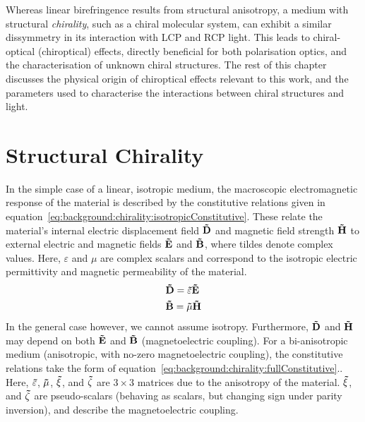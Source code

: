Whereas linear birefringence results from structural anisotropy, a medium with structural \textit{chirality}, such as a chiral molecular system, can exhibit a similar dissymmetry in its interaction with LCP and RCP light. This leads to chiral-optical (chiroptical) effects, directly beneficial for both polarisation optics, and the characterisation of unknown chiral structures. The rest of this chapter discusses the physical origin of chiroptical effects relevant to this work, and the parameters used to characterise the interactions between chiral structures and light.


\section{Structural Chirality}\label{sec:background:Chirality:Structural}
In the simple case of a linear, isotropic medium, the macroscopic electromagnetic response of the material is described by the constitutive relations given in equation~\ref{eq:background:chirality:isotropicConstitutive}. These relate the material's internal electric displacement field $\bf{\tilde D}$ and magnetic field strength $\bf{\tilde H}$ to external electric and magnetic fields $\bf{\tilde E}$ and $\bf{\tilde B}$, where tildes denote complex values. Here, $\varepsilon$ and $\mu$ are complex scalars and correspond to the isotropic electric permittivity and magnetic permeability of the material.
\begin{equation}\label{eq:background:chirality:isotropicConstitutive}
	\begin{split}
        & \bf{\tilde D} = \tilde \varepsilon \bf{\tilde E} \\
        & \bf{\tilde B} = \tilde \mu \bf{\tilde H}
	\end{split}
\end{equation}
In the general case however, we cannot assume isotropy. Furthermore, $\bf{\tilde D}$ and $\bf{\tilde H}$ may depend on both $\bf{\tilde E}$ and $\bf{\tilde B}$ (magnetoelectric coupling). For a bi-anisotropic medium (anisotropic, with no-zero magnetoelectric coupling), the constitutive relations take the form of equation~\ref{eq:background:chirality:fullConstitutive}.\cite{Ishimaru2003, Capolino2009}. Here, $\bf{\tilde \varepsilon}$, $\bf{\tilde \mu}$, $\bf{\tilde \xi}$, and $\bf{\tilde \zeta}$ are $3 \times 3$ matrices due to the anisotropy of the material. $\bf{\tilde \xi}$, and $\bf{\tilde \zeta}$ are pseudo-scalars (behaving as scalars, but changing sign under parity inversion), and describe the magnetoelectric coupling.

